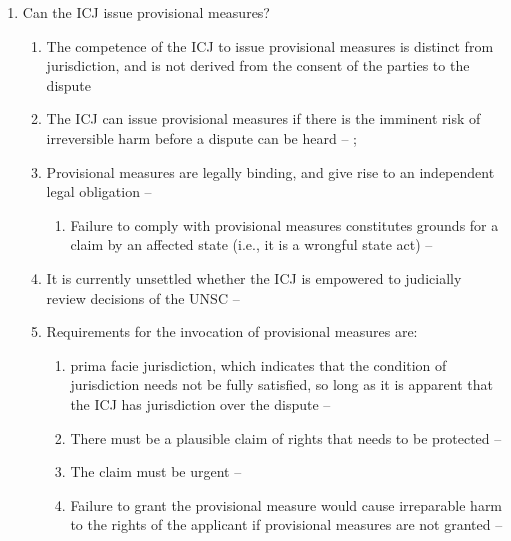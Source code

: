 \begin{enumerate}
\begin{enumerate}
\begin{enumerate}
        \end{enumerate}
    \end{enumerate}
    \item Can the ICJ issue provisional measures?
    \begin{enumerate}
        \item The competence of the ICJ to issue provisional measures is distinct from jurisdiction, and is not derived from the consent of the parties to the dispute
        \item The ICJ can issue provisional measures if there is the imminent risk of irreversible harm before a dispute can be heard -- ; 
        \item Provisional measures are legally binding, and give rise to an independent legal obligation -- 
        \begin{enumerate}
            \item Failure to comply with provisional measures constitutes grounds for a claim by an affected state (i.e., it is a wrongful state act) -- 
        \end{enumerate}
        \item It is currently unsettled whether the ICJ is empowered to judicially review decisions of the UNSC -- 
        \item Requirements for the invocation of provisional measures are:
        \begin{enumerate}
            \item \Gls{prima facie} jurisdiction, which indicates that the condition of jurisdiction needs not be fully satisfied, so long as it is apparent that the ICJ has jurisdiction over the dispute -- 
            \item There must be a plausible claim of rights that needs to be protected -- 
            \item The claim must be urgent -- 
            \item Failure to grant the provisional measure would cause irreparable harm to the rights of the applicant if provisional measures are not granted -- 

\end{enumerate}
\end{enumerate}
\end{enumerate}
